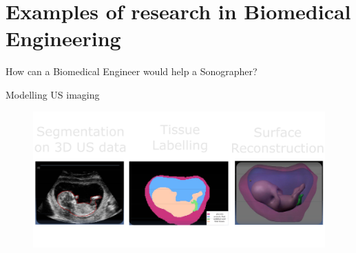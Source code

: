 
\section{Examples of research in Biomedical Engineering}


{
\begin{frame}{}

\BigSizeFont
How can a Biomedical Engineer would help a Sonographer?
\end{frame}
}








{


\begin{frame}{Modelling US imaging}
      \begin{figure}
        \centering
        \includegraphics[width=1.0\textwidth]{./figures/modelling-us-imaging/versions/drawing-v02}
      \end{figure}
\end{frame}
}




%
%







